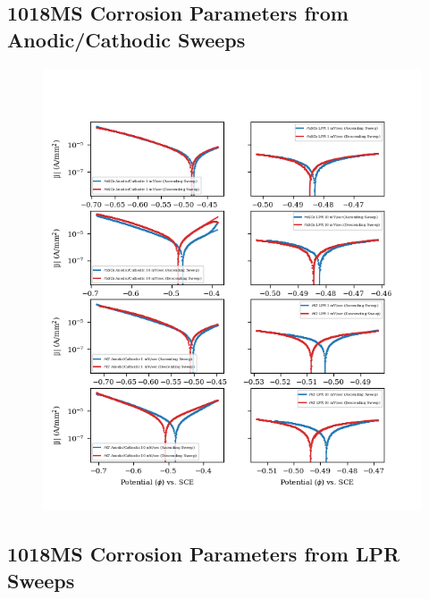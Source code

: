 \subsection{1018MS Corrosion Parameters from Anodic/Cathodic Sweeps}




\begin{table}[h!]
	\centering
	
\end{table}

\begin{table}[h!]
	\centering
	
\end{table}

\begin{figure}[h!]
	\centering
	\includegraphics[width=1.0\linewidth]{resources/fig_2b.png}
\end{figure}


\subsection{1018MS Corrosion Parameters from LPR Sweeps}

